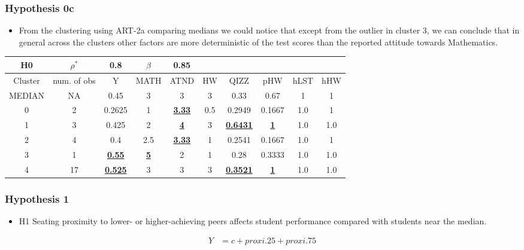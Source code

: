 \documentclass{beamer} %
\theoremstyle{definition}
\begin{document}
	\begin{frame}
		\frametitle{Hypothesis 0c}
		\begin{itemize}
			\item From the clustering using ART-2a comparing medians we could notice that except from the outlier in cluster 3, we can conclude that in general across the clusters other factors are more deterministic of the test scores than the reported attitude towards Mathematics.
		\end{itemize}
		\begin{table}
		\tiny
		\begin{tabular}{|c|c|c|c|c|c|c|c|c|c|}
			\hline
			H0 & $\rho^*$ & 0.8 & $\beta$ & 0.85 &  &  &  &  &  \\
			\hline
			Cluster & num. of obs & Y & MATH & ATND & HW & QIZZ & pHW & hLST & hHW \\
			\hline
			MEDIAN & NA & 0.45 & 3 & 3 & 3 & 0.33 & 0.67 & 1 & 1 \\
			\hline
			0 & 2 & 0.2625 & 1 & \underline{\textbf{3.33}} & 0.5 & 0.2949 & 0.1667 & 1.0 & 1 \\
			1 & 3 & 0.425 & 2 & \underline{\textbf{4}} & 3 & \underline{\textbf{0.6431}} & \underline{\textbf{1}} & 1.0 & 1.0 \\
			2 & 4 & 0.4 & 2.5 & \underline{\textbf{3.33}} & 1 & 0.2541 & 0.1667 & 1.0 & 1 \\
			3 & 1 & \underline{\textbf{0.55}} & \underline{\textbf{5}} & 2 & 1 & 0.28 & 0.3333 & 1.0 & 1.0 \\
			4 & 17 & \underline{\textbf{0.525}} & 3 & 3 & 3 & \underline{\textbf{0.3521}} & \underline{\textbf{1}} & 1.0 & 1.0 \\
			\hline
		\end{tabular}
		\end{table}
	\end{frame}
	
	\begin{frame}
		\frametitle{Hypothesis 1}
		\centering
		\begin{itemize}
			\item H1 Seating proximity to lower- or higher-achieving peers affects student performance compared with students near the median.
		\end{itemize}
		\vspace{1em}
		\begin{equation*}
			\begin{aligned}
				Y &= c + proxi.25 + proxi.75
			\end{aligned}
		\end{equation*}
	\end{frame}
	
\end{document}
